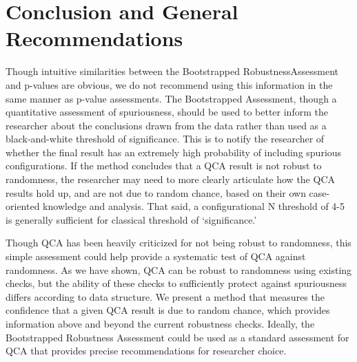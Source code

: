 \documentclass[12pt]{article}
\begin{document}
{{{{%


\section{Conclusion and General Recommendations}

Though intuitive similarities between the Bootstrapped RobustnessAssessment and p-values are obvious, we do not recommend using this information in the same manner as p-value assessments. The Bootstrapped Assessment, though a quantitative assessment of spuriousness, should be used to better inform the researcher about the conclusions drawn from the data rather than used as a black-and-white threshold of significance. This is to notify the researcher of whether the final result has an extremely high probability of including spurious configurations. If the method concludes that a QCA result is not robust to randomness, the researcher may need to more clearly articulate how the QCA results hold up, and are not due to random chance, based on their own case-oriented knowledge and analysis.  That said, a configurational N threshold of 4-5 is generally sufficient for classical threshold of `significance.'

Though QCA has been heavily criticized for not being robust to randomness, this simple assessment could help provide a systematic test of QCA against randomness. As we have shown, QCA can be robust to randomness using existing checks, but the ability of these checks to sufficiently protect against spuriousness differs according to data structure. We present a method that measures the confidence that a given QCA result is due to random chance, which provides information above and beyond the current robustness checks. Ideally, the Bootstrapped Robustness Assessment could be used as a standard assessment for QCA that provides precise recommendations for researcher choice. 




}}}}
\end{document}
